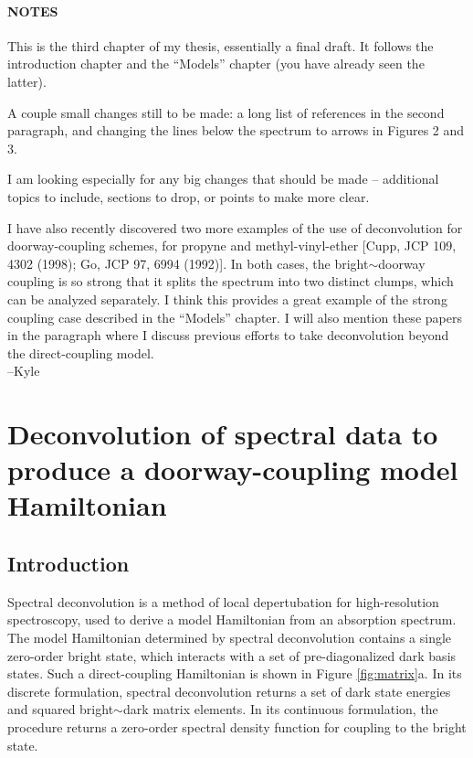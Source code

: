 \documentclass[12pt]{mitthesis}
\begin{document}
\tableofcontents
\clearpage

\subsubsection*{NOTES}

This is the third chapter of my thesis, essentially a final draft.  It
follows the introduction chapter and the ``Models'' chapter (you
have already seen the latter).

A couple small changes still to be made: a long list of references in
the second paragraph, and changing the lines below the spectrum to
arrows in Figures 2 and 3.

I am looking especially for any big changes that should be made --
additional topics to include, sections to drop, or points to make more
clear.

I have also recently discovered two more examples of the use of
deconvolution for doorway-coupling schemes, for propyne and
methyl-vinyl-ether [Cupp, JCP 109, 4302 (1998); Go, JCP 97, 6994
(1992)].  In both cases, the bright$\sim$doorway coupling is so strong
that it splits the spectrum into two distinct clumps, which can be
analyzed separately.  I think this provides a great example of the
strong coupling case described in the ``Models'' chapter.  I will also
mention these papers in the paragraph where I discuss previous efforts
to take deconvolution beyond the direct-coupling model.\\

--Kyle

\clearpage

\chapter{Deconvolution of spectral data to produce a doorway-coupling
  model Hamiltonian}

\section{Introduction}

Spectral deconvolution is a method of local depertubation for
high-resolution spectroscopy, used to derive a model Hamiltonian from
an absorption spectrum.  The model Hamiltonian determined by spectral
deconvolution contains a single zero-order bright state, which
interacts with a set of pre-diagonalized dark basis states.  Such a
direct-coupling Hamiltonian is shown in Figure \ref{fig:matrix}a.  In
its discrete formulation, spectral deconvolution returns a set of dark
state energies and squared bright$\sim$dark matrix elements.  In its
continuous formulation, the procedure returns a zero-order spectral
density function for coupling to the bright state.
\end{document}
